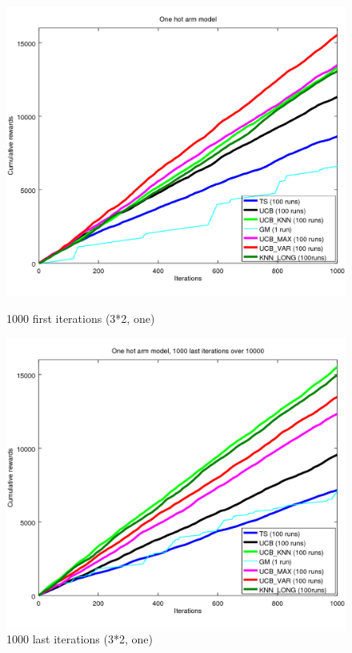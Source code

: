\documentclass[french]{beamer}
\begin{document}
\begin{frame}
	\begin{figure}[h]
		\begin{minipage}[b]{.49\linewidth}
			\includegraphics[width=1.0\textwidth]{begin_1000it.png}
			\caption{1000 first iterations (3*2, one)}
		\end{minipage}
		\hfill
		\begin{minipage}[b]{0.49\linewidth}
			\includegraphics[width=1.0\textwidth]{last_1000it.png}
			\caption{1000 last iterations (3*2, one)}
		\end{minipage}
		\label{fig:f}
	\end{figure}
	

\end{frame}
\end{document}
